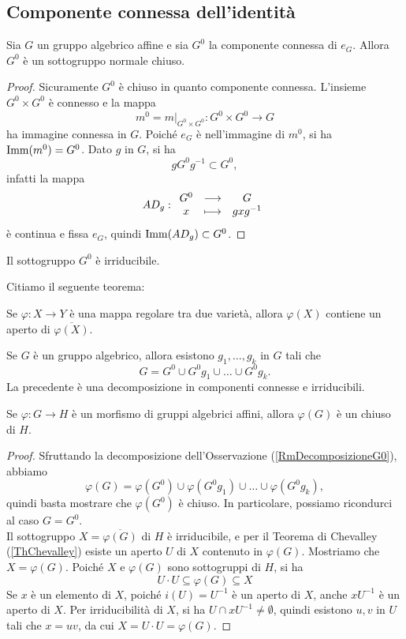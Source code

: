 \subsection{Componente connessa dell'identit\`a}
\begin{proposition}
    Sia $G$ un gruppo algebrico affine e sia $G^0$ la componente connessa di $e_G$. Allora $G^0$ è un sottogruppo normale chiuso.
\end{proposition}
\begin{proof}
    Sicuramente $G^0$ è chiuso in quanto componente connessa. L'insieme $G^0\times G^0$ è connesso e la mappa \[ m^0=\left.m\right|_{G^0\times G^0}\colon G^0\times G^0 \longrightarrow G\] ha immagine connessa in $G$. Poiché $e_G$ è nell'immagine di $m^0$, si ha $\operatorname{Imm}(m^0)=G^0$. Dato $g$ in $G$, si ha \[gG^0g^{-1}\subset G^0,\]
    infatti la mappa
    \[AD_g:\begin{array}{ccc} {G^0} & \longrightarrow & {G}\\ {x} & \longmapsto & {gxg^{-1}} \end{array}\]
    \`e continua e fissa $e_G$, quindi $\operatorname{Imm}(AD_g)\subset G^0$.
\end{proof}

\begin{exercise}
    Il sottogruppo $G^0$ è irriducibile.
\end{exercise}

Citiamo il seguente teorema:

\begin{theorem}[Chevalley]\label{ThChevalley}
    Se $\varphi\colon X \to Y$ è una mappa regolare tra due varietà, allora $\varphi(X)$ contiene un aperto di $\overline{\varphi(X)}$.
\end{theorem}

\begin{remark}\label{RmDecomposizioneG0}
    Se $G$ è un gruppo algebrico, allora esistono $g_1,\ldots,g_k$ in $G$ tali che \[G=G^0 \cup G^0 g_1 \cup \ldots\cup G^0g_k.\]
    La precedente è una decomposizione in componenti connesse e irriducibili.
\end{remark}

\begin{proposition}
    Se $\varphi\colon G \to H$ è un morfismo di gruppi algebrici affini, allora $\varphi(G)$ è un chiuso di $H$.
\end{proposition}
\begin{proof}
    Sfruttando la decomposizione dell'Osservazione (\ref{RmDecomposizioneG0}), abbiamo
    \[\varphi(G)=\varphi(G^0) \cup \varphi(G^0 g_1) \cup \ldots\cup \varphi(G^0g_k),\]
    quindi basta mostrare che $\varphi(G^0)$ è chiuso. In particolare, possiamo ricondurci al caso $G=G^0$. \\
    Il sottogruppo $X=\overline{\varphi(G)}$ di $H$ è irriducibile, e per il Teorema di Chevalley (\ref{ThChevalley}) esiste un aperto $U$ di $X$ contenuto in $\varphi(G)$. Mostriamo che $X=\varphi(G)$. Poiché $X$ e $\varphi(G)$ sono sottogruppi di $H$, si ha \[U\cdot U \subseteq \varphi(G)\subseteq X\]
    Se $x$ è un elemento di $X$, poiché $i(U)=U^{-1}$ è un aperto di $X$, anche $xU^{-1}$ è un aperto di $X$. Per irriducibilità di $X$, si ha $U\cap xU^{-1} \ne \emptyset$, quindi esistono $u,v$ in $U$ tali che $x=uv$, da cui $X=U\cdot U =\varphi(G)$.
\end{proof}




